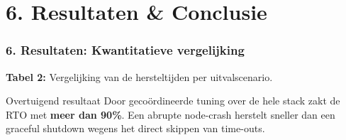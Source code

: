 \documentclass[aspectratio=169]{beamer}
\begin{document}
    
    \section{6. Resultaten \& Conclusie}
    
    \begin{frame}
        \frametitle{6. Resultaten: Kwantitatieve vergelijking}
        \begin{center}
            \begin{minipage}{0.85\textwidth}
                \begin{table}
                    \centering
                    \par\vspace{0.2cm}
                    \scriptsize 
                    \textbf{Tabel 2:} Vergelijking van de hersteltijden per uitvalscenario.
                \end{table}
                
                \begin{alertblock}{Overtuigend resultaat}
                    Door gecoördineerde tuning over de hele stack zakt de RTO met \textbf{meer dan 90\%}. Een abrupte node-crash herstelt sneller dan een graceful shutdown wegens het direct skippen van time-outs.
                \end{alertblock}
            \end{minipage}
        \end{center}
    \end{frame}
    
\end{document}
